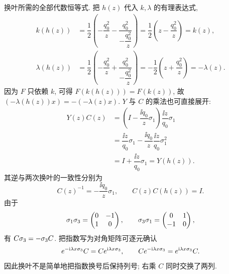 \par\medskip\noindent 换叶所需的全部代数恒等式.\quad
把 $h(z)$ 代入 $k,\lambda$ 的有理表达式,
\begin{align*}
k(h(z))
&=\dfrac{1}{2}\left(-\dfrac{q_0^2}{z}
-\dfrac{q_0^2}{-\dfrac{q_0^2}{z}}\right)
=\dfrac{1}{2}\left(z-\dfrac{q_0^2}{z}\right)=k(z),\\
\lambda(h(z))
&=\dfrac{1}{2}\left(-\dfrac{q_0^2}{z}
+\dfrac{q_0^2}{-\dfrac{q_0^2}{z}}\right)
=-\dfrac{1}{2}\left(z+\dfrac{q_0^2}{z}\right)=-\lambda(z).
\end{align*}
因为 $F$ 只依赖 $k$, 可得 $F(k(h(z)))=F(k(z))$,
故 $(-\lambda(h(z))x)=-(-\lambda(z)x)$.
$Y$ 与 $C$ 的乘法也可直接展开:
\begin{align*}
Y(z)C(z)
&=\left(I-\dfrac{\ii q_0}{z}\sigma_1\right)
\dfrac{\ii z}{q_0}\sigma_1\\
&=\dfrac{\ii z}{q_0}\sigma_1
-\dfrac{\ii q_0}{z}\dfrac{\ii z}{q_0}\sigma_1^2\\
&=I+\dfrac{\ii z}{q_0}\sigma_1=Y(h(z)).
\end{align*}
其逆与两次换叶的一致性分别为
\begin{equation*}
C(z)^{-1}=-\dfrac{\ii q_0}{z}\sigma_1,
\qquad C(z)C(h(z))=I.
\end{equation*}
由于
\begin{equation*}
\sigma_1\sigma_3=\begin{pmatrix}0&-1\\1&0\end{pmatrix},
\qquad
\sigma_3\sigma_1=\begin{pmatrix}0&1\\-1&0\end{pmatrix},
\end{equation*}
有 $C\sigma_3=-\sigma_3 C$.
把指数写为对角矩阵可逐元确认
\begin{equation*}
e^{-\mathrm{i}\lambda x\sigma_3}C
=C e^{\mathrm{i}\lambda x\sigma_3},
\qquad
C e^{-\mathrm{i}\lambda x\sigma_3}=e^{\mathrm{i}\lambda x\sigma_3}C.
\end{equation*}
因此换叶不是简单地把指数换号后保持列号;
右乘 $C$ 同时交换了两列.


